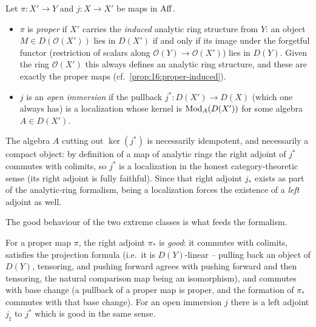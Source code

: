 \begin{definition}
\label{def:17:proper-open}
Let $\pi\colon X'\to Y$ and $j\colon X\to X'$ be maps in $\operatorname{Aff}$.
\begin{itemize}
\item $\pi$ is \emph{proper} if $X'$ carries the \emph{induced} analytic ring structure
from $Y$: an object $M\in D(\mathcal O(X'))$ lies in $D(X')$ if and only if its image
under the forgetful functor (restriction of scalars along $\mathcal O(Y)\to\mathcal O(X')$)
lies in $D(Y)$. Given the ring $\mathcal O(X')$ this always defines an analytic ring
structure, and these are exactly the proper maps (cf.\ \cref{prop:16:proper-induced}).
\item $j$ is an \emph{open immersion} if the pullback
$j^{*}\colon D(X')\to D(X)$ (which one always has) is a localization whose kernel is
$\operatorname{Mod}_{A}(D(X'))$ for some algebra $A\in D(X')$.
\end{itemize}
\end{definition}

\begin{remark}
\label{rmk:17:idempotent-algebra}
The algebra $A$ cutting out $\ker(j^{*})$ is necessarily idempotent, and necessarily a
compact object: by definition of a map of analytic rings the right adjoint of $j^{*}$
commutes with colimits, so $j^{*}$ is a localization in the honest category-theoretic
sense (its right adjoint is fully faithful). Since that right adjoint $j_{*}$ exists as
part of the analytic-ring formalism, being a localization forces the existence of a
\emph{left} adjoint as well.
\end{remark}

The good behaviour of the two extreme classes is what feeds the formalism.

\begin{remark}
\label{rmk:17:good}
For a proper map $\pi$, the right adjoint $\pi_{*}$ is \emph{good}: it commutes with
colimits, satisfies the projection formula (i.e.\ it is $D(Y)$-linear -- pulling back an
object of $D(Y)$, tensoring, and pushing forward agrees with pushing forward and then
tensoring, the natural comparison map being an isomorphism), and commutes with base
change (a pullback of a proper map is proper, and the formation of $\pi_{*}$ commutes
with that base change). For an open immersion $j$ there is a left adjoint $j_{\natural}$
to $j^{*}$ which is good in the same sense.
\end{remark}

